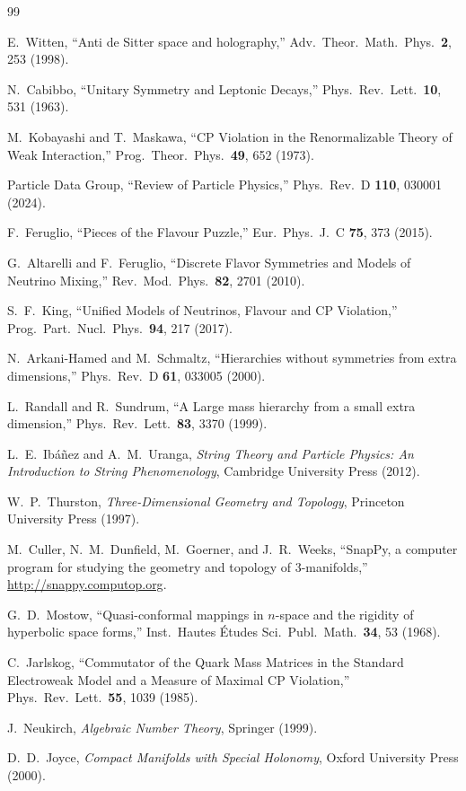 \documentclass[epjc3]{svjour3}
\begin{document}
\begin{thebibliography}{99}

E.~Witten,
``Anti de Sitter space and holography,''
Adv.\ Theor.\ Math.\ Phys.\ \textbf{2}, 253 (1998).

N.~Cabibbo,
``Unitary Symmetry and Leptonic Decays,''
Phys.\ Rev.\ Lett.\ \textbf{10}, 531 (1963).

M.~Kobayashi and T.~Maskawa,
``CP Violation in the Renormalizable Theory of Weak Interaction,''
Prog.\ Theor.\ Phys.\ \textbf{49}, 652 (1973).

Particle Data Group,
``Review of Particle Physics,''
Phys.\ Rev.\ D \textbf{110}, 030001 (2024).

F.~Feruglio,
``Pieces of the Flavour Puzzle,''
Eur.\ Phys.\ J.\ C \textbf{75}, 373 (2015).

G.~Altarelli and F.~Feruglio,
``Discrete Flavor Symmetries and Models of Neutrino Mixing,''
Rev.\ Mod.\ Phys.\ \textbf{82}, 2701 (2010).

S.~F.~King,
``Unified Models of Neutrinos, Flavour and CP Violation,''
Prog.\ Part.\ Nucl.\ Phys.\ \textbf{94}, 217 (2017).

N.~Arkani-Hamed and M.~Schmaltz,
``Hierarchies without symmetries from extra dimensions,''
Phys.\ Rev.\ D \textbf{61}, 033005 (2000).

L.~Randall and R.~Sundrum,
``A Large mass hierarchy from a small extra dimension,''
Phys.\ Rev.\ Lett.\ \textbf{83}, 3370 (1999).

L.~E.~Ib\'a\~nez and A.~M.~Uranga,
\emph{String Theory and Particle Physics: An Introduction to String Phenomenology},
Cambridge University Press (2012).

W.~P.~Thurston,
\emph{Three-Dimensional Geometry and Topology},
Princeton University Press (1997).

M.~Culler, N.~M.~Dunfield, M.~Goerner, and J.~R.~Weeks,
``SnapPy, a computer program for studying the geometry and topology 
of 3-manifolds,''
\url{http://snappy.computop.org}.

G.~D.~Mostow,
``Quasi-conformal mappings in $n$-space and the rigidity of hyperbolic 
space forms,''
Inst.\ Hautes \'Etudes Sci.\ Publ.\ Math.\ \textbf{34}, 53 (1968).

C.~Jarlskog,
``Commutator of the Quark Mass Matrices in the Standard Electroweak 
Model and a Measure of Maximal CP Violation,''
Phys.\ Rev.\ Lett.\ \textbf{55}, 1039 (1985).

J.~Neukirch,
\emph{Algebraic Number Theory},
Springer (1999).

D.~D.~Joyce,
\emph{Compact Manifolds with Special Holonomy},
Oxford University Press (2000).

\end{thebibliography}
\end{document}
